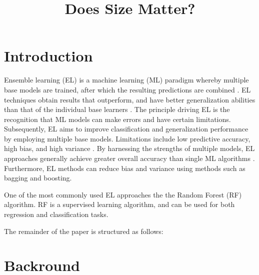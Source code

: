 \documentclass[conference]{IEEEtran}
\begin{document}
\title{Does Size Matter?}

\author{
}

\maketitle

\begin{abstract}

\end{abstract}

\section{Introduction}

    Ensemble learning (EL) is a machine learning (ML) paradigm whereby multiple base models are trained, after which the resulting
    predictions are combined \cite{mienye2022survey,naderalvojoud2024improving}. EL techniques obtain results that outperform,
    and have better generalization abilities than that of the individual base learners \cite{zhou2021formulating}. The principle
    driving EL is the recognition that ML models can make errors and have certain limitations. Subsequently, EL aims to improve
    classification and generalization performance by employing multiple base models. Limitations include low predictive accuracy,
    high bias, and high variance \cite{mishra2022improving,sun2021classifier}. By harnessing the strengths of multiple models,
    EL approaches generally achieve greater overall accuracy than single ML algorithms \cite{brown2011ensemble}. Furthermore,
    EL methods can reduce bias and variance using methods such as bagging and boosting. 
    
    One of the most commonly used EL approaches the the Random Forest (RF) algorithm. RF is a supervised learning algorithm, and
    can be used for both regression and classification tasks. 


    The remainder of the paper is structured as follows:

\section{Backround}
\end{document}

